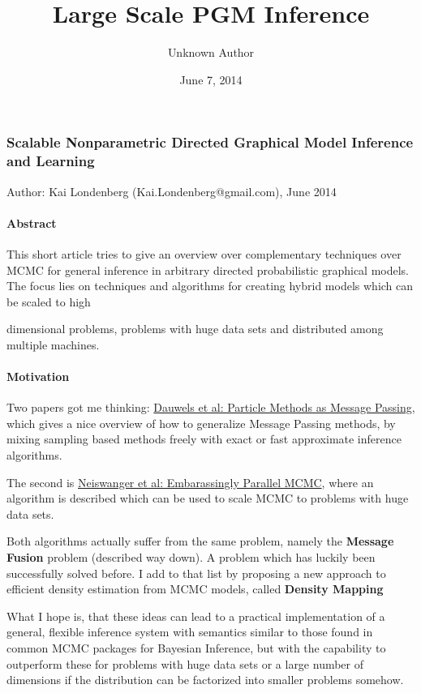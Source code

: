 \documentclass[letterpaper,10pt,english]{/home/londenberg/python-env/clean/lib/python2.7/site-packages/sphinx/texinputs/sphinxhowto}
\title{Large Scale PGM Inference}
\date{June 7, 2014}
\author{Unknown Author}
\begin{document}
        
            \maketitle
        

        


        
        \subsubsection{Scalable Nonparametric Directed Graphical Model Inference
and Learning}

Author: Kai Londenberg (Kai.Londenberg@gmail.com), June 2014

\paragraph{Abstract}

This short article tries to give an overview over complementary
techniques over MCMC for general inference in arbitrary directed
probabilistic graphical models. The focus lies on techniques and
algorithms for creating hybrid models which can be scaled to high

dimensional problems, problems with huge data sets and distributed among
multiple machines.

\paragraph{Motivation}

Two papers got me thinking:
\href{http://www.dauwels.com/Papers/Particle.pdf}{Dauwels et al:
Particle Methods as Message Passing}, which gives a nice overview of how
to generalize Message Passing methods, by mixing sampling based methods
freely with exact or fast approximate inference algorithms.

The second is \href{http://arxiv.org/pdf/1311.4780v1.pdf}{Neiswanger et
al: Embarassingly Parallel MCMC}, where an algorithm is described which
can be used to scale MCMC to problems with huge data sets.

Both algorithms actually suffer from the same problem, namely the
\textbf{Message Fusion} problem (described way down). A problem which
has luckily been successfully solved before. I add to that list by
proposing a new approach to efficient density estimation from MCMC
models, called \textbf{Density Mapping}

What I hope is, that these ideas can lead to a practical implementation
of a general, flexible inference system with semantics similar to those
found in common MCMC packages for Bayesian Inference, but with the
capability to outperform these for problems with huge data sets or a
large number of dimensions if the distribution can be factorized into
smaller problems somehow.
\end{document}
